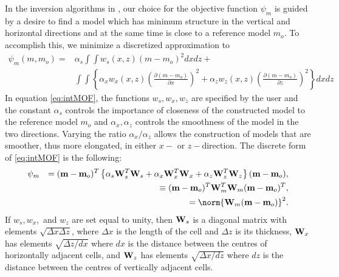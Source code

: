 In the inversion algorithms in \programName, our choice for the objective function $\psi_m$ is guided by a desire to find a model which has minimum structure in the vertical and horizontal directions and at the same time is close to a reference model $m_o$. To accomplish this, we minimize a discretized approximation to 
%
\begin{eqnarray}
\psi_m(m,m_o) = &\alpha_s \int\int w_s(x,z)(m-m_o)^2 dxdz + \nonumber \\
&\int \int \left\{ \alpha_x w_x(x,z) \left( \frac{\partial(m-m_o)}{\partial x} \right)^2 + \alpha_z w_z(x,z)\left( \frac{\partial(m-m_o)}{\partial z} \right)^2 \right\} dxdz
\label{eq:intMOF}
\end{eqnarray}
%
In equation \ref{eq:intMOF}, the functions $w_s,w_x,w_z$ are specified by the user and the constant $\alpha_s$ controls the importance of closeness of the constructed model to the reference model $m_o$ and $\alpha_x,\alpha_z$ controls the smoothness of the model in the two directions. Varying the ratio $\alpha_x/\alpha_z$ allows the construction of models that are smoother, thus more elongated, in either $x-$ or $z-$direction. The discrete form of \ref{eq:intMOF} is the following:
%
\begin{eqnarray}
\psi_m &&= (\bvec{m}-\bvec{m}_o)^T\left\{ \alpha_s \mathbf{W}_s^T\mathbf{W}_s+\alpha_x \mathbf{W}_x^T\mathbf{W}_x+\alpha_z \mathbf{W}_z^T\mathbf{W}_z \right\} (\bvec{m}-\bvec{m}_o), \nonumber \\
&&\equiv (\bvec{m}-\bvec{m}_o)^T\mathbf{W}_m^T\mathbf{W}_m(\bvec{m}-\bvec{m}_o)^T, \\
\label{eq:shortMOF}
&&= \norm{\mathbf{W}_m(\bvec{m}-\bvec{m}_o)}^2.
\label{eq:disMOF}
\end{eqnarray}
%
If $w_s, w_x,$ and $w_z$ are set equal to unity, then $\mathbf{W}_s$ is a diagonal matrix with elements $\sqrt{\Delta x \Delta z}$, where $\Delta x$ is the length of the cell and $\Delta z$ is its thickness, $\mathbf{W}_x$ has elements $\sqrt{\Delta z / dx}$ where $dx$ is the distance between the centres of horizontally adjacent cells, and $\mathbf{W}_z$ has elements $\sqrt{\Delta x / dz}$ where $dz$ is the distance between the centres of vertically adjacent cells.

